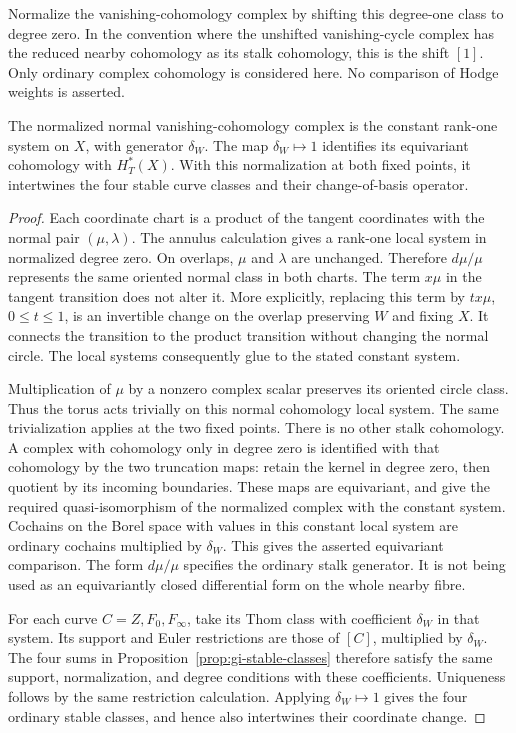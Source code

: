 Normalize the vanishing-cohomology complex by shifting this degree-one class to degree zero.
In the convention where the unshifted vanishing-cycle complex has the reduced nearby cohomology as its stalk cohomology, this is the shift $[1]$.
Only ordinary complex cohomology is considered here.
No comparison of Hodge weights is asserted.

\begin{proposition}\label{prop:gi-critical-comparison}
The normalized normal vanishing-cohomology complex is the constant rank-one system on $X$, with generator $\delta_W$.
The map $\delta_W\mapsto1$ identifies its equivariant cohomology with $H_T^*(X)$.
With this normalization at both fixed points, it intertwines the four stable curve classes and their change-of-basis operator.
\end{proposition}
\begin{proof}
Each coordinate chart is a product of the tangent coordinates with the normal pair $(\mu,\lambda)$.
The annulus calculation gives a rank-one local system in normalized degree zero.
On overlaps, $\mu$ and $\lambda$ are unchanged.
Therefore $d\mu/\mu$ represents the same oriented normal class in both charts.
The term $x\mu$ in the tangent transition does not alter it.
More explicitly, replacing this term by $t x\mu$, $0\leq t\leq1$, is an invertible change on the overlap preserving $W$ and fixing $X$.
It connects the transition to the product transition without changing the normal circle.
The local systems consequently glue to the stated constant system.

Multiplication of $\mu$ by a nonzero complex scalar preserves its oriented circle class.
Thus the torus acts trivially on this normal cohomology local system.
The same trivialization applies at the two fixed points.
There is no other stalk cohomology.
A complex with cohomology only in degree zero is identified with that cohomology by the two truncation maps: retain the kernel in degree zero, then quotient by its incoming boundaries.
These maps are equivariant, and give the required quasi-isomorphism of the normalized complex with the constant system.
Cochains on the Borel space with values in this constant local system are ordinary cochains multiplied by $\delta_W$.
This gives the asserted equivariant comparison.
The form $d\mu/\mu$ specifies the ordinary stalk generator.
It is not being used as an equivariantly closed differential form on the whole nearby fibre.

For each curve $C=Z,F_0,F_\infty$, take its Thom class with coefficient $\delta_W$ in that system.
Its support and Euler restrictions are those of $[C]$, multiplied by $\delta_W$.
The four sums in Proposition~\ref{prop:gi-stable-classes} therefore satisfy the same support, normalization, and degree conditions with these coefficients.
Uniqueness follows by the same restriction calculation.
Applying $\delta_W\mapsto1$ gives the four ordinary stable classes, and hence also intertwines their coordinate change.
\end{proof}

